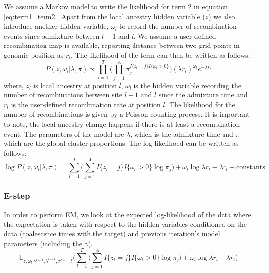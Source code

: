 We assume a Markov model to write the likelihood for term 2 in equation \ref{eq:term1_term2}. Apart from the local ancestry hidden variable ($z$) we also introduce another hidden variable, $\omega_l$ to record the number of recombination events since admixture between $l-1$ and $l$. We assume a user-defined recombination map is available, reporting distance between two grid points in genomic position as $r_l$. The likelihood of the term can then be written as follows:
\begin{equation}
    P(z, \omega_l \vert \lambda, \pi) \propto \prod\limits_{l=1}^{T} \Big( \prod\limits_{j=1}^{A} \pi_j ^ {I\{z_l = j\} I\{\omega_l > 0\}} \Big) (\lambda r_l)^{\omega_l} e^{-\lambda r_l}
\end{equation}
where, $z_l$ is local ancestry at position $l$, $\omega_l$ is the hidden variable recording the number of recombinations between site $l-1$ and $l$ since the admixture time and $r_l$ is the user-defined recombination rate at position $l$. The likelihood for the number of recombinations is given by a Poisson counting process. It is important to note, the local ancestry change happens if there is at least a recombination event. The parameters of the model are $\lambda$, which is the admixture time and $\pi$ which are the global cluster proportions. The log-likelihood can be written as follows:
\begin{equation}
    \log P(z, \omega_l \vert \lambda, \pi) = \sum\limits_{l=1}^{T} \Big( \sum\limits_{j=1}^{A} I\{z_l = j\} I\{\omega_l > 0\} \log \pi_j \Big) + \omega_l \log \lambda r_l - \lambda r_l + \text{constants}
\end{equation}

\subsubsection{E-step}
\label{sec:term2_estep}

In order to perform EM, we look at the expected log-likelihood of the data where the expectation is taken with respect to the hidden variables conditioned on the data (coalescence times with the target) and previous iteration's model parameters (including the $\gamma$).
\begin{equation}
    \mathbb{E}_{z, \omega_l \vert \gamma^{t-1}, \lambda^{t-1}, \pi^{t-1}, t}\Big( \sum\limits_{l=1}^{T} \Big( \sum\limits_{j=1}^{A} I\{z_l = j\} I\{\omega_l > 0\} \log \pi_j \Big) + \omega_l \log \lambda r_l - \lambda r_l \Big)
\end{equation}

